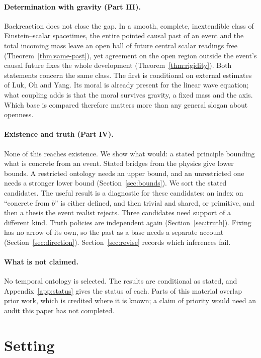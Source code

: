 \documentclass[11pt]{article}
\theoremstyle{definition}
\begin{document}
\paragraph{Determination with gravity (Part III).} Backreaction does not close the
gap. In a smooth, complete, inextendible class of Einstein--scalar spacetimes, the
entire pointed causal past of an event and the total incoming mass leave an open
ball of future central scalar readings free (Theorem~\ref{thm:same-past}), yet
agreement on the open region outside the event's causal future fixes the whole
development (Theorem~\ref{thm:rigidity}). Both statements concern the same class. The
first is conditional on external estimates of Luk, Oh and Yang. Its moral is already
present for the linear wave equation; what coupling adds is that the moral survives
gravity, a fixed mass and the axis. Which base is compared therefore matters more than
any general slogan about openness.

\paragraph{Existence and truth (Part IV).} None of this reaches existence. We show
what would: a stated principle bounding what is concrete from an event. Stated bridges from the physics give lower bounds. A restricted ontology needs an upper bound, and an unrestricted
one needs a stronger lower bound (Section~\ref{sec:bounds}). We sort the stated candidates. The useful result is a diagnostic for these candidates: an index on ``concrete from $b$'' is either defined, and then trivial and shared, or primitive, and then a thesis the event realist rejects. Three candidates need support of a different kind. Truth policies are independent again (Section~\ref{sec:truth}). Fixing has no arrow of its own, so the past as a base needs a separate account (Section~\ref{sec:direction}). Section~\ref{sec:revise} records which inferences fail.

\paragraph{What is not claimed.} No temporal ontology is selected. The results are
conditional as stated, and Appendix~\ref{app:status} gives the status of each. Parts
of this material overlap prior work, which is credited where it is known; a claim of
priority would need an audit this paper has not completed.

\section{Setting}\label{sec:setting}
\end{document}

